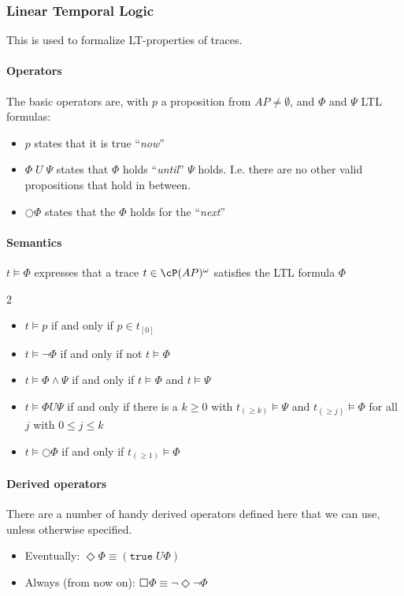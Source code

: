 \subsubsection{Linear Temporal Logic}
\label{sec:ltl-details}
This is used to formalize LT-properties of traces.

\paragraph{Operators}
The basic operators are, with $p$ a proposition from $AP \neq \emptyset$, and $\Phi$ and $\Psi$ LTL formulas:
\begin{itemize}
    \item $p$ states that it is true ``\textit{now}''
    \item $\Phi \; U \; \Psi$ states that $\Phi$ holds ``\textit{until}'' $\Psi$ holds. I.e. there are no other valid propositions that hold in between.
    \item $\bigcirc \Phi$ states that the $\Phi$ holds for the ``\textit{next}''
\end{itemize}


\paragraph{Semantics}
$t \models \Phi$ expresses that a trace $t \in \cP(AP)^\omega$ satisfies the LTL formula $\Phi$
\begin{multicols}{2}
    \begin{itemize}
        \item $t \models p$ if and only if $p \in t_{[0]}$
        \item $t \models \neg \Phi$ if and only if not $t \models \Phi$
        \item $t \models \Phi \land \Psi$ if and only if $t \models \Phi$ and $t \models \Psi$
        \item $t \models \Phi U \Psi$ if and only if there is a $k \geq 0$ with $t_{(\geq k)} \models \Psi$ and $t_{(\geq j)} \models \Phi$ for all $j$ with $0 \leq j \leq k$
        \item $t \models \bigcirc \Phi$ if and only if $t_{(\geq 1)} \models \Phi$
    \end{itemize}
\end{multicols}


\paragraph{Derived operators}
There are a number of handy derived operators defined here that we can use, unless otherwise specified.
\begin{itemize}
    \item Eventually: $\Diamond \Phi \equiv (\texttt{true}\; U \Phi)$
    \item Always (from now on): $\Square \Phi \equiv \neg \Diamond \neg \Phi$
\end{itemize}

